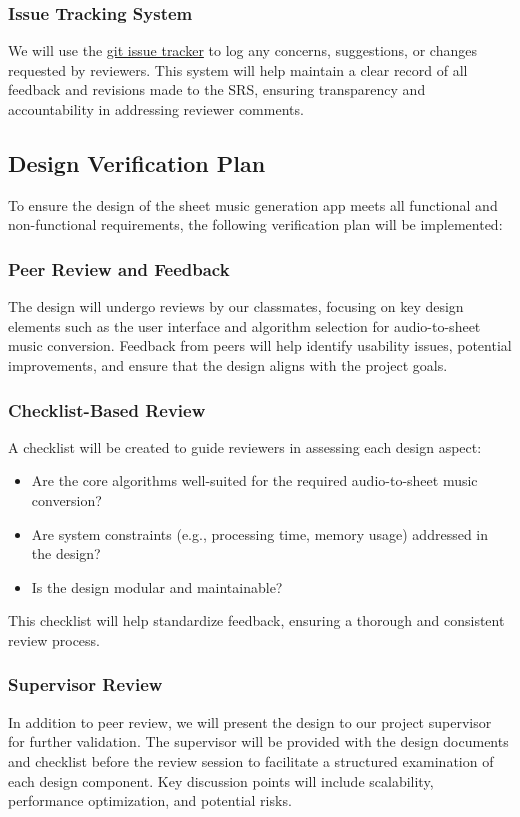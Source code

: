 \documentclass[12pt, titlepage]{article}
\begin{document}
\subsubsection{Issue Tracking System}
We will use the \href{https://github.com/users/emilyperica/projects/1}{git issue tracker} to log any concerns, suggestions, or 
changes requested by reviewers. This system will help maintain a clear record of all feedback and revisions made to the SRS, 
ensuring transparency and accountability in addressing reviewer comments.


\subsection{Design Verification Plan}

To ensure the design of the sheet music generation app meets all functional and non-functional requirements, the following 
verification plan will be implemented:

\subsubsection*{Peer Review and Feedback}
The design will undergo reviews by our classmates, focusing on key design elements such as the user interface and algorithm 
selection for audio-to-sheet music conversion. Feedback from peers will help identify usability issues, potential improvements, 
and ensure that the design aligns with the project goals.

\subsubsection*{Checklist-Based Review}
A checklist will be created to guide reviewers in assessing each design aspect:
\begin{itemize}
    \item Are the core algorithms well-suited for the required audio-to-sheet music conversion?
    \item Are system constraints (e.g., processing time, memory usage) addressed in the design?
    \item Is the design modular and maintainable?
\end{itemize}
This checklist will help standardize feedback, ensuring a thorough and consistent review process.

\subsubsection*{Supervisor Review}
In addition to peer review, we will present the design to our project supervisor for further validation. The supervisor will be 
provided with the design documents and checklist before the review session to facilitate a structured examination of each design 
component. Key discussion points will include scalability, performance optimization, and potential risks. 
\end{document}
